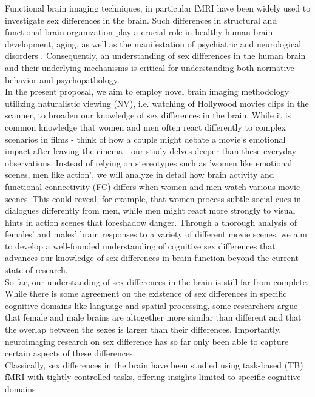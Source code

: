 \documentclass[11pt,a4paper]{article}
\begin{document}
Functional brain imaging techniques, in particular fMRI have been widely used to investigate sex differences in the brain.
Such differences in structural and functional brain organization play a crucial role in healthy human brain development, 
aging, as well as the manifestation of psychiatric and neurological disorders \parencite{cahillWhySexMatters2006a,gobinathSexHormonesGenotype2017a}. 
Consequently, an understanding of sex differences in the human brain and 
their underlying mechanisms is critical for understanding both normative behavior and psychopathology. \\
In the present proposal, we aim to employ novel brain imaging methodology utilizing naturalistic viewing (NV), 
i.e. watching of Hollywood movies clips in the scanner, to broaden our knowledge of sex differences in the brain. 
While it is common knowledge that women and men often react differently to complex scenarios in 
films - think of how a couple might debate a movie's emotional impact after leaving the cinema - our study 
delves deeper than these everyday observations. Instead of relying on stereotypes such as 
'women like emotional scenes, men like action', we will analyze in detail how brain activity and functional 
connectivity (FC) differs when women and men watch various movie scenes. This could reveal, for example, 
that women process subtle social cues in dialogues differently from men, while men might react more strongly to 
visual hints in action scenes that foreshadow danger. Through a thorough analysis of females' and males' brain 
responses to a variety of different movie scenes, we aim to develop a well-founded understanding of cognitive 
sex differences that advances our knowledge of sex differences in brain function beyond 
the current state of research.\\
So far, our understanding of sex differences in the brain is still far from complete. 
While there is some agreement on the existence of sex differences in specific cognitive domains like 
language and spatial processing, some researchers argue that female and male brains are altogether more similar 
than different \parencite{joelSexGenitaliaHuman2015a} and that the overlap between the sexes is larger than their differences. 
Importantly, neuroimaging research on sex difference has so far only been able to capture certain aspects of these 
differences.\\ 
Classically, sex differences in the brain have been studied using task-based (TB) fMRI with tightly 
controlled tasks, offering insights limited to specific cognitive domains 
\end{document}
